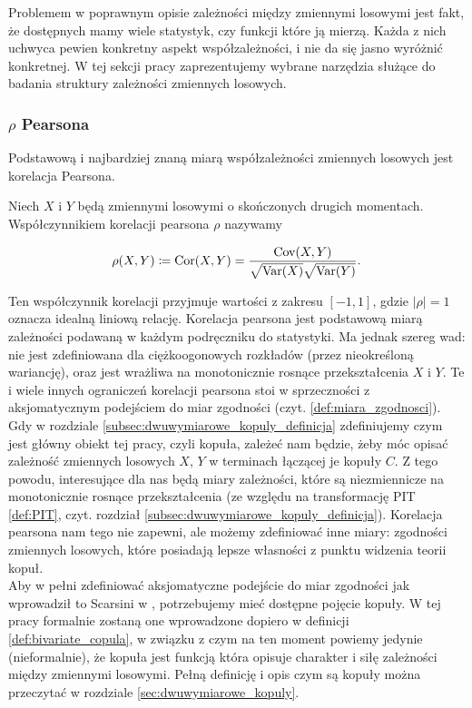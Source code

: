 Problemem w poprawnym opisie zależności między zmiennymi losowymi jest fakt, że dostępnych mamy wiele statystyk, czy funkcji które ją mierzą. Każda z nich uchwyca pewien konkretny aspekt współzależności, i nie da się jasno wyróżnić konkretnej. W tej sekcji pracy zaprezentujemy wybrane narzędzia służące do badania struktury zależności zmiennych losowych.

\subsubsection{$\rho$ Pearsona}
Podstawową i najbardziej znaną miarą współzależności zmiennych losowych jest korelacja Pearsona.

\begin{df}
	Niech $X$ i $Y$ będą zmiennymi losowymi o skończonych drugich momentach. Współczynnikiem korelacji pearsona $\rho$ nazywamy
	
	$$ \rho(X, Y) \coloneqq \text{Cor}(X,Y) = \frac{\text{Cov}(X,Y)}{\sqrt{\text{Var}(X)}\sqrt{\text{Var}(Y)}}.$$
\end{df}

Ten współczynnik korelacji przyjmuje wartości z zakresu $[-1, 1]$, gdzie $\vert\rho\vert=1$ oznacza idealną liniową relację. Korelacja pearsona jest podstawową miarą zależności podawaną w każdym podręczniku do statystyki. Ma jednak szereg wad: nie jest zdefiniowana dla ciężkoogonowych rozkładów (przez nieokreśloną wariancję), oraz jest wrażliwa na monotonicznie rosnące przekształcenia $X$ i $Y$. Te i wiele innych ograniczeń korelacji pearsona stoi w sprzeczności z aksjomatycznym podejściem do miar zgodności (czyt. \ref{def:miara_zgodnosci}). \\
Gdy w rozdziale \ref{subsec:dwuwymiarowe_kopuly_definicja} zdefiniujemy czym jest główny obiekt tej pracy, czyli kopuła, zależeć nam będzie, żeby móc opisać zależność zmiennych losowych $X$, $Y$ w terminach łączącej je kopuły $C$. Z tego powodu, interesujące dla nas będą miary zależności, które są niezmiennicze na monotonicznie rosnące przekształcenia (ze względu na transformację PIT \ref{def:PIT}, czyt. rozdział \ref{subsec:dwuwymiarowe_kopuly_definicja}). Korelacja pearsona nam tego nie zapewni, ale możemy zdefiniować inne miary: zgodności zmiennych losowych, które posiadają lepsze własności z punktu widzenia teorii kopuł.\\

Aby w pełni zdefiniować aksjomatyczne podejście do miar zgodności jak wprowadził to Scarsini w \cite{Scarsini1984}, potrzebujemy mieć dostępne pojęcie kopuły. W tej pracy formalnie zostaną one wprowadzone dopiero w definicji \ref{def:bivariate_copula}, w związku z czym na ten moment powiemy jedynie (nieformalnie), że kopuła jest funkcją która opisuje charakter i siłę zależności między zmiennymi losowymi. Pełną definicję i opis czym są kopuły można przeczytać w rozdziale \ref{sec:dwuwymiarowe_kopuly}.

